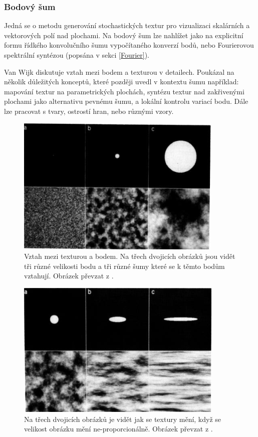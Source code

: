 \subsubsection{Bodový šum}
\label{SpotNoise}
Jedná se o metodu generování stochastických textur pro vizualizaci skalárních a vektorových polí nad plochami. Na bodový šum lze nahlížet jako na explicitní formu řídkého konvolučního šumu vypočítaného konverzí bodů, nebo Fourierovou spektrální syntézou (popsána v sekci \ref{Fourier}).

Van Wijk \cite{Wijk91} diskutuje vztah mezi bodem a texturou v detailech. Poukázal na několik důležitých konceptů, které později uvedl v kontextu šumu například: mapování textur na parametrických plochách, syntézu textur nad zakřivenými plochami jako alternativu pevnému šumu, a lokální kontrolu variací bodu. Dále lze pracovat s tvary, ostrostí hran, nebo různými vzory.

\begin{figure}[H]
	\centering
	\includegraphics[scale=0.7]{obrazky-figures/SpotNoiseSize.png}
	\caption{Vztah mezi texturou a bodem. Na třech dvojicích obrázků jsou vidět tři různé velikosti bodu a tři různé šumy které se k těmto bodům vztahují. Obrázek převzat z \cite{Wijk91}.}
	\label{fig:SpotNoise}
\end{figure}
\begin{figure}[H]
	\centering
	\includegraphics[scale=0.7]{obrazky-figures/SpotNoiseNonProportional.png}
	\caption{Na třech dvojicích obrázků je vidět jak se textury mění, když se velikost obrázku mění ne-proporcionálně. Obrázek převzat z \cite{Wijk91}.}
	\label{fig:SpotNoiseNonProportional}
\end{figure}

